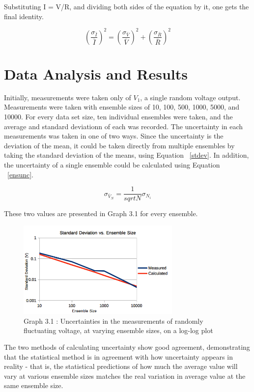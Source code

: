 \documentclass[journal]{IEEEtran}
\begin{document}
Substituting I = V/R, and dividing both sides of the equation by it, one gets
the final identity.

\begin{equation}
\label{currentunc}
\left( \frac{\sigma _{\bar I}}{\bar I} \right)^2 = \left( \frac{\sigma _{\bar
V}}{\bar V} \right)^2 + \left( \frac{\sigma _{\bar R}}{\bar R} \right)^2
\end{equation}

\section{Data Analysis and Results}

Initially, measurements were taken only of $V_1$, a single random voltage
output.  Measurements were taken with ensemble sizes of 10, 100, 500, 1000,
5000, and 10000. For every data set size, ten individual ensembles were taken,
and the average and standard deviationn of each was recorded. The uncertainty
in each measurements was taken in one of two ways. Since the uncertainty is the
deviation of the mean, it could be taken directly from multiple ensembles by
taking the standard deviation of the means, using Equation ~\ref{stdev}. In
addition, the uncertainty of a single ensemble could be calculated using
Equation ~\ref{ensunc}.

\begin{equation}
\label{ensunc}
\sigma _{\bar V_{N}} = \frac{1}{sqrt{N}} \sigma _{N_{i}}
\end{equation}

These two values are presented in Graph 3.1 for every ensemble.

\begin{figure}[ht!]
\centering
\includegraphics[width=80mm]{measure.png}
\caption{Graph 3.1 : Uncertainties in the measurements of randomly fluctuating
voltage, at varying ensemble sizes, on a log-log plot}
\end{figure}

The two methods of calculating uncertainty show good agreement, demonstrating
that the statistical method is in agreement with how uncertainty appears in
reality - that is, the statistical predictions of how much the average value
will vary at various ensemble sizes matches the real variation in average value
at the same ensemble size.
\end{document}
